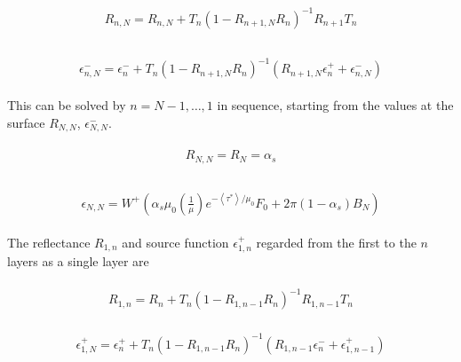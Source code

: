 \begin{eqnarray}
\begin{array}{c}
R_{n, N}=R_{n, N}+T_{n}\left(1-R_{n+1, N} R_{n}\right)^{-1} R_{n+1} T_{n} \\
\end{array}
\end{eqnarray}

\begin{eqnarray}
\begin{array}{c}
\epsilon_{n, N}^{-}=\epsilon_{n}^{-}+T_{n}\left(1-R_{n+1, N} R_{n}\right)^{-1}\left(R_{n+1, N} \epsilon_{n}^{+}+\epsilon_{n, N}^{-}\right)
\end{array}
\end{eqnarray}

This can be solved by \(n=N-1,\dots,1\) in sequence, starting from the values at the surface \(R_{N, N}\), \(\epsilon_{N, N}^{-}\).

\begin{eqnarray}
\begin{array}{c}
R_{N, N}=R_{N}=\alpha_{s} \\
\end{array}
\end{eqnarray}

\begin{eqnarray}
\begin{array}{c}
\epsilon_{N, N}=W^{+}\left(\alpha_{s} \mu_{0}\left(\frac{1}{\mu}\right) e^{-\left\langle\tau^{*}\right\rangle / \mu_{0}} F_{0}+2 \pi\left(1-\alpha_{s}\right) B_{N}\right)
\end{array}
\end{eqnarray}

The reflectance \(R_{1, n}\) and source function \(\epsilon_{1, n}^{+}\) regarded from the first to the \(n\) layers as a single layer are

\begin{eqnarray}
\begin{array}{c}
R_{1, n}=R_{n}+T_{n}\left(1-R_{1, n-1} R_{n}\right)^{-1} R_{1, n-1} T_{n}
\end{array}
\end{eqnarray}

\begin{eqnarray}
\begin{array}{c}
\epsilon_{1, N}^{+}=\epsilon_{n}^{+}+T_{n}\left(1-R_{1, n-1} R_{n}\right)^{-1}\left(R_{1, n-1} \epsilon_{n}^{-}+\epsilon_{1, n-1}^{+}\right)
\end{array}
\end{eqnarray}

